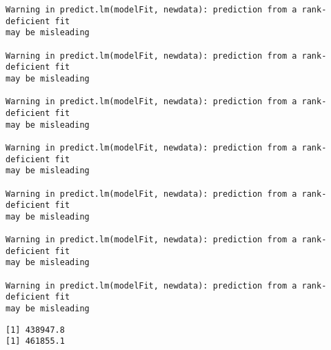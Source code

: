 \documentclass[
  letterpaper,
  DIV=11,
  numbers=noendperiod]{scrartcl}
\begin{document}
\begin{verbatim}
Warning in predict.lm(modelFit, newdata): prediction from a rank-deficient fit
may be misleading

Warning in predict.lm(modelFit, newdata): prediction from a rank-deficient fit
may be misleading

Warning in predict.lm(modelFit, newdata): prediction from a rank-deficient fit
may be misleading

Warning in predict.lm(modelFit, newdata): prediction from a rank-deficient fit
may be misleading

Warning in predict.lm(modelFit, newdata): prediction from a rank-deficient fit
may be misleading

Warning in predict.lm(modelFit, newdata): prediction from a rank-deficient fit
may be misleading

Warning in predict.lm(modelFit, newdata): prediction from a rank-deficient fit
may be misleading
\end{verbatim}

\begin{verbatim}
[1] 438947.8
[1] 461855.1
\end{verbatim}
\end{document}
